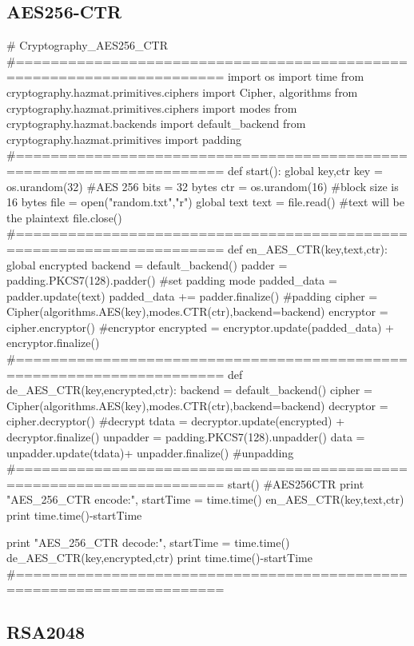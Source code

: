 \documentclass{article}
\begin{document}
\subsection{AES256-CTR}
\begin{python}
# Cryptography_AES256_CTR
#======================================================================
import os
import time
from cryptography.hazmat.primitives.ciphers import Cipher, algorithms
from cryptography.hazmat.primitives.ciphers import modes
from cryptography.hazmat.backends import default_backend
from cryptography.hazmat.primitives import padding
#======================================================================
def start():
    global key,ctr
    key = os.urandom(32)                    #AES 256 bits = 32 bytes
    ctr = os.urandom(16)                    #block size is 16 bytes
    file = open("random.txt","r")
    global text 
    text = file.read()                      #text will be the plaintext
    file.close()
#======================================================================
def en_AES_CTR(key,text,ctr):
    global encrypted
    backend = default_backend()
    padder = padding.PKCS7(128).padder()              #set padding mode
    padded_data = padder.update(text)
    padded_data += padder.finalize()                           #padding
    cipher = Cipher(algorithms.AES(key),modes.CTR(ctr),backend=backend)
    encryptor = cipher.encryptor()
    #encryptor
    encrypted = encryptor.update(padded_data) + encryptor.finalize()
#======================================================================
def de_AES_CTR(key,encrypted,ctr):
    backend = default_backend()
    cipher = Cipher(algorithms.AES(key),modes.CTR(ctr),backend=backend)
    decryptor = cipher.decryptor()
    #decrypt
    tdata = decryptor.update(encrypted) + decryptor.finalize()
    unpadder = padding.PKCS7(128).unpadder()
    data = unpadder.update(tdata)+ unpadder.finalize()       #unpadding
#======================================================================
start()
#AES256CTR
print "AES_256_CTR encode:",
startTime = time.time()
en_AES_CTR(key,text,ctr)
print time.time()-startTime

print "AES_256_CTR decode:",
startTime = time.time()
de_AES_CTR(key,encrypted,ctr)
print time.time()-startTime
#======================================================================
\end{python}
\newpage
\subsection{RSA2048}
\end{document}
